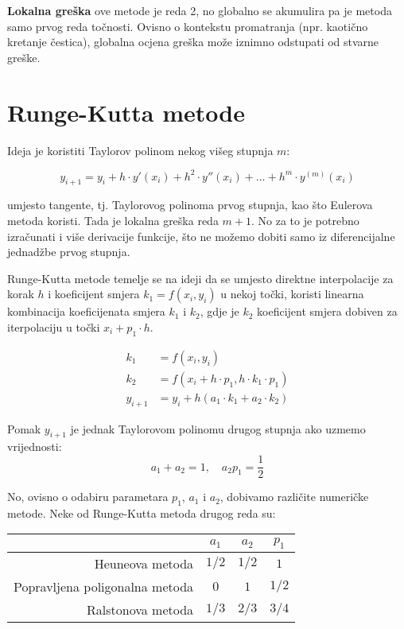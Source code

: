\smallskip

\textbf{Lokalna greška} ove metode je reda 2, no globalno se akumulira pa je
metoda samo prvog reda točnosti. Ovisno o kontekstu promatranja (npr. kaotično
kretanje čestica), globalna ocjena greška može iznimno odstupati od stvarne
greške.

\section{Runge-Kutta metode}

Ideja je koristiti Taylorov polinom nekog višeg stupnja $m$:

$$
y_{i+1} = y_i + h\cdot y'(x_i) + h^2 \cdot y''(x_i) + \dots + h^m \cdot y^{(m)}(x_i)
$$

umjesto tangente, tj. Taylorovog polinoma prvog stupnja, kao što Eulerova metoda
koristi. Tada je lokalna greška reda $m + 1$. No za to je potrebno izračunati i
više derivacije funkcije, što ne možemo dobiti samo iz diferencijalne jednadžbe
prvog stupnja.

Runge-Kutta metode temelje se na ideji da se umjesto direktne interpolacije za
korak $h$ i koeficijent smjera $k_1 = f(x_i,y_i)$ u nekoj točki, koristi
linearna kombinacija koeficijenata smjera $k_1$ i $k_2$, gdje je $k_2$
koeficijent smjera dobiven za iterpolaciju u točki $x_i + p_1\cdot h$.

\begin{align*}
    k_1 &= f(x_i,y_i)\\
    k_2 &= f(x_i + h \cdot p_1,h\cdot k_1\cdot p_1)\\
    y_{i+1} &= y_i + h (a_1\cdot k_1 + a_2 \cdot k_2)
\end{align*}

Pomak $y_{i+1}$ je jednak Taylorovom polinomu drugog stupnja ako uzmemo
vrijednosti:
$$
a_1 + a_2 = 1,\quad a_2 p_1 = \frac{1}{2}
$$

No, ovisno o odabiru parametara $p_1$, $a_1$ i $a_2$, dobivamo različite
numeričke metode. Neke od Runge-Kutta metoda drugog reda su:

\begin{center}
\begin{tabular}{r|c|c|c}
    & $a_1$ & $a_2$ & $p_1$\\
    \hline
    Heuneova metoda & $1/2$ & $1/2$ & $1$\\
    \hline
    Popravljena poligonalna metoda & $0$ & $1$ & $1/2$\\
    \hline
    Ralstonova metoda & $1/3$ & $2/3$ & $3/4$\\
\end{tabular}
\end{center}


